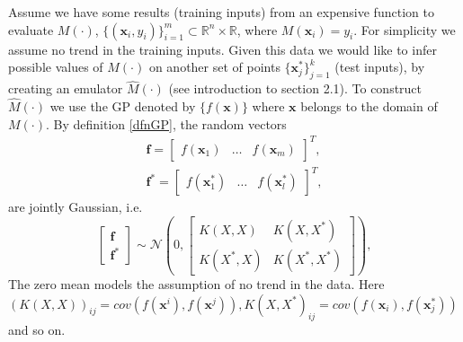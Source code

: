 \documentclass[12pt]{book}
\newcommand{\x}{\textbf{x}}
\begin{document}
Assume  we have some  results  (training inputs) from an expensive function to evaluate $M(\cdot)$, 
$\{(\textbf{x}_{i},y_{i})\}_{i=1}^{m}\subset\mathbb{R}^{n}\times\mathbb{R}$, where $M(\textbf{x}_{i})=y_{i}$. For
simplicity we assume no trend in the training inputs. Given this data 
we would like to infer  possible values of $M(\cdot)$ on another set of points 
$\{\textbf{x}_{j}^{*}\}_{j=1}^{k}$ (test inputs),
by creating an emulator $\hat{M}(\cdot)$ (see introduction to section 2.1).
To construct $\hat{M}(\cdot)$  we  use the GP denoted by $\{f(\textbf{x})\}$ where $\textbf{x}$ 
belongs to the domain of $M(\cdot)$.
 By
definition \ref{dfnGP}, the random vectors
\begin{eqnarray*}
\textbf{f}=\begin{bmatrix}f(\textbf{x}_{1}) & \ldots & f(\textbf{x}_{m}) \end{bmatrix}^{T}, \\
\textbf{f}^{*}=\begin{bmatrix}f(\textbf{x}_{1}^{*}) & \ldots & f(\textbf{x}_{l}^{*}) \end{bmatrix}^{T},
\end{eqnarray*}
are  jointly Gaussian, i.e. 
\begin{equation}\label{eqnconditional}
\begin{bmatrix}
\textbf{f} \\
\textbf{f}^{*}
\end{bmatrix}\sim\mathscr{N}\left(0,\begin{bmatrix} K(X,X) & K(X,X^{*}) \\
						    K(X^{*},X) & K(X^{*},X^{*}) \end{bmatrix}
\right),
\end{equation}	
The zero mean models the assumption of no trend in the data. 
Here
$(K(X,X))_{ij}=cov(f(\x^{i}),f(\x^{j})), K(X,X^{*})_{ij}=cov(f(\textbf{x}_{i}),f(\x_{j}^{*}))$ and so on.
\end{document}
